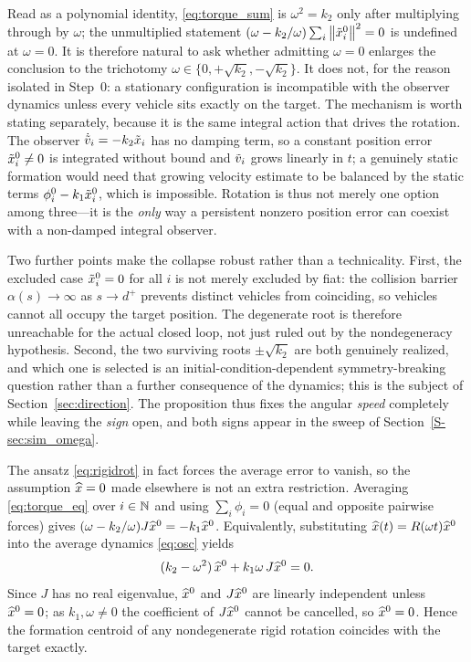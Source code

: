 \begin{remark}\label{rem:trichotomy}
Read as a polynomial identity, \eqref{eq:torque_sum} is $\omega^2=k_2$ only after multiplying through
by $\omega$; the unmultiplied statement $(\omega-k_2/\omega)\sum_i\left\| \tilde{x}_i^0 \right\|^2=0$ is undefined at
$\omega=0$. It is therefore natural to ask whether admitting $\omega=0$ enlarges the conclusion to the
trichotomy $\omega\in\{0,+\sqrt{k_2},-\sqrt{k_2}\}$. It does not, for the reason isolated in Step~0: a
stationary configuration is incompatible with the observer dynamics unless every vehicle sits exactly
on the target. The mechanism is worth stating separately, because it is the same integral action that
drives the rotation. The observer $\dot{\tilde{v}}_i=-k_2\tilde{x}_i$ has no damping term, so a constant
position error $\tilde{x}_i^0\ne0$ is integrated without bound and $\tilde{v}_i$ grows linearly in $t$; a
genuinely static formation would need that growing velocity estimate to be balanced by the static
terms $\phi_i^0-k_1\tilde{x}_i^0$, which is impossible. Rotation is thus not merely one option among
three---it is the \emph{only} way a persistent nonzero position error can coexist with a
non-damped integral observer.

Two further points make the collapse robust rather than a technicality. First, the excluded case
$\tilde{x}_i^0=0$ for all $i$ is not merely excluded by fiat: the collision barrier
$\alpha(s)\to\infty$ as $s\to d^+$ prevents distinct vehicles from coinciding, so vehicles cannot all
occupy the target position. The degenerate root is therefore unreachable for the actual closed loop, not
just ruled out by the nondegeneracy hypothesis. Second, the two surviving roots $\pm\sqrt{k_2}$ are
both genuinely realized, and which one is selected is an initial-condition-dependent
symmetry-breaking question rather than a further consequence of the dynamics; this is the subject of
Section~\ref{sec:direction}. The proposition thus fixes the angular \emph{speed} completely while
leaving the \emph{sign} open, and both signs appear in the sweep of
Section~\ref{S-sec:sim_omega}.
\end{remark}

\begin{remark}\label{rem:centroid}
The ansatz \eqref{eq:rigidrot} in fact forces the average error to vanish, so the assumption
$\widehat{x}=0$ made elsewhere is not an extra restriction. Averaging \eqref{eq:torque_eq} over $i\in\mathbb{N}$ and
using $\sum_i\phi_i=0$ (equal and opposite pairwise forces) gives
$(\omega-k_2/\omega)J\widehat{x}^0=-k_1\widehat{x}^0$. Equivalently, substituting $\widehat{x}(t)=R(\omega t)\widehat{x}^0$ into the
average dynamics \eqref{eq:osc} yields
\begin{equation}
  (k_2-\omega^2)\,\widehat{x}^0+k_1\omega\,J\widehat{x}^0=0 .
\end{equation}
Since $J$ has no real eigenvalue, $\widehat{x}^0$ and $J\widehat{x}^0$ are linearly independent unless $\widehat{x}^0=0$;
as $k_1,\omega\ne0$ the coefficient of $J\widehat{x}^0$ cannot be cancelled, so $\widehat{x}^0=0$. Hence the
formation centroid of any nondegenerate rigid rotation coincides with the target exactly.
\end{remark}


